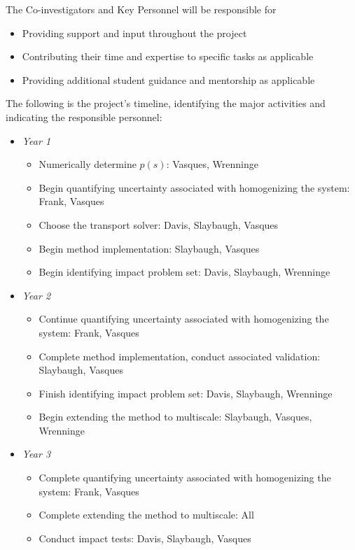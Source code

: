 \documentclass[12pt]{article}
\begin{document}
The Co-investigators and Key Personnel will be responsible for
\begin{itemize}[noitemsep]
\item Providing support and input throughout the project
\item Contributing their time and expertise to specific tasks as applicable
\item Providing additional student guidance and mentorship as applicable
\end{itemize}

The following is the project's timeline, identifying the major activities and indicating the responsible personnel:
\begin{itemize}
\item \textit{Year 1}
\begin{itemize}[noitemsep]
\item Numerically determine $p(s)$: Vasques, Wrenninge
\item Begin quantifying uncertainty associated with homogenizing the system: Frank, Vasques
\item Choose the transport solver: Davis, Slaybaugh, Vasques
\item Begin method implementation: Slaybaugh, Vasques
\item Begin identifying impact problem set: Davis, Slaybaugh, Wrenninge
\end{itemize}
\item \textit{Year 2}
\begin{itemize}[noitemsep]
\item Continue quantifying uncertainty associated with homogenizing the system: Frank, Vasques
\item Complete method implementation, conduct associated validation: Slaybaugh, Vasques
\item Finish identifying impact problem set: Davis, Slaybaugh, Wrenninge
\item Begin extending the method to multiscale: Slaybaugh, Vasques, Wrenninge
\end{itemize}
\item \textit{Year 3}
\begin{itemize}[noitemsep]
\item Complete quantifying uncertainty associated with homogenizing the system: Frank, Vasques 
\item Complete extending the method to multiscale: All
\item Conduct impact tests: Davis, Slaybaugh, Vasques
\end{itemize}
\end{itemize}
\end{document}
